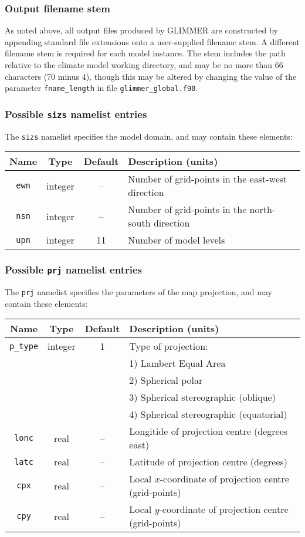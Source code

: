 \documentclass[11pt]{article}
\begin{document}
\subsubsection{Output filename stem}
%
As noted above, all output files produced by GLIMMER are constructed by
appending standard file extensions onto a user-supplied filename
stem. A different filename stem is required for each model instance. The stem
includes the path relative to the climate model working directory, and may be
no more than 66 characters (70 minus 4), though this may be altered
by changing the value of the parameter \texttt{fname\_length} in file
\texttt{glimmer\_global.f90}.
%
\subsubsection{Possible \texttt{sizs} namelist entries}
%
The \texttt{sizs} namelist specifies the model domain,
and may contain these elements:
%
\begin{center}
\begin{tabular}{|c|c|c|l|}
\hline
Name & Type & Default & Description (units) \\
\hline
\hline
\texttt{ewn} & integer & -- & Number of grid-points in the east-west
direction \\
\texttt{nsn} & integer & -- & Number of grid-points in the north-south
direction \\
\texttt{upn} & integer & 11 & Number of model levels \\
\hline
\end{tabular}
\end{center}
%
\subsubsection{Possible \texttt{prj} namelist entries}
%
The \texttt{prj} namelist specifies the parameters of the map projection, and
may contain these elements:
%
\begin{center}
\begin{tabular}{|c|c|c|l|}
\hline
Name & Type & Default & Description (units) \\
\hline
\hline
\texttt{p\_type} & integer & 1 & Type of projection: \\
 & & & 1) Lambert Equal Area \\
 & & & 2) Spherical polar \\
 & & & 3) Spherical stereographic (oblique) \\
 & & & 4) Spherical stereographic (equatorial) \\
\hline  
\texttt{lonc} & real & -- & Longitide of projection centre (degrees east) \\
\texttt{latc} & real & -- & Latitude of projection centre (degrees)\\
\texttt{cpx} & real & -- & Local $x$-coordinate of projection centre
(grid-points) \\
\texttt{cpy} & real & -- & Local $y$-coordinate of projection centre
(grid-points) \\
\hline
\end{tabular}
\end{center}
%
\end{document}
